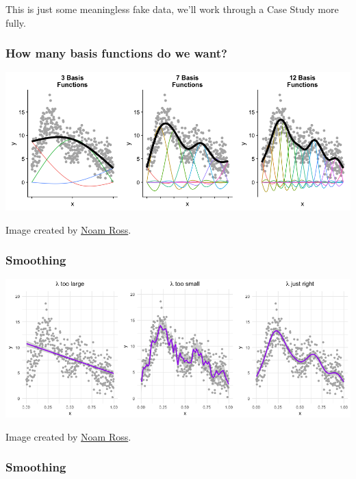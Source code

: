 \documentclass[
  openany]{book}
\begin{document}
This is just some meaningless fake data, we'll work through a Case Study more fully.

\hypertarget{how-many-basis-functions-do-we-want}{%
\subsubsection{How many basis functions do we want?}\label{how-many-basis-functions-do-we-want}}

\begin{center}\includegraphics[width=1\linewidth]{images/m5/diffbasis-nr} \end{center}

Image created by \href{https://github.com/noamross/gams-in-r-course/blob/master/images/diffbasis-1.png}{Noam Ross}.

\hypertarget{smoothing}{%
\subsubsection{Smoothing}\label{smoothing}}

\begin{center}\includegraphics[width=1\linewidth]{images/m5/diffsmooth-1} \end{center}

Image created by \href{https://github.com/noamross/gams-in-r-course/blob/master/images/diffsmooth-1.png}{Noam Ross}.

\hypertarget{smoothing-1}{%
\subsubsection{Smoothing}\label{smoothing-1}}
\end{document}
